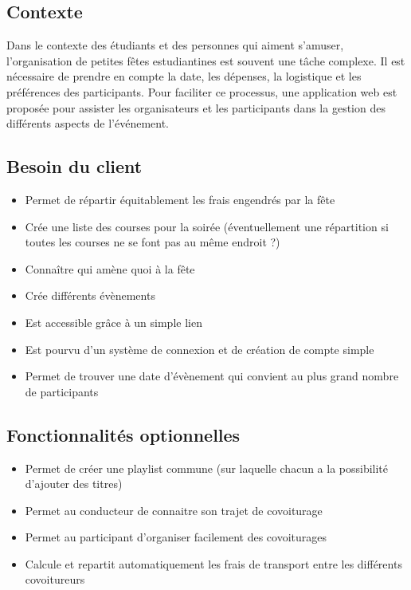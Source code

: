 \subsection{Contexte}\label{subsec:contexte}
Dans le contexte des étudiants et des personnes qui aiment s'amuser, l'organisation de petites fêtes estudiantines est souvent une tâche complexe.
Il est nécessaire de prendre en compte la date, les dépenses, la logistique et les préférences des participants.
Pour faciliter ce processus, une application web est proposée pour assister les organisateurs et les participants dans la gestion des différents aspects de l'événement.

\subsection{Besoin du client}\label{subsec:besoin-du-client}
\begin{itemize}
    \item Permet de répartir équitablement les frais engendrés par la fête
    \item Crée une liste des courses pour la soirée (éventuellement une répartition si toutes les courses ne se font pas au même endroit ?)
    \item Connaître qui amène quoi à la fête
    \item Crée différents évènements
    \item Est accessible grâce à un simple lien
    \item Est pourvu d'un système de connexion et de création de compte simple
    \item Permet de trouver une date d’évènement qui convient au plus grand nombre de participants
\end{itemize}

\subsection{Fonctionnalités optionnelles}\label{subsec:fonctionnalites-optionnelles}
\begin{itemize}
    \item Permet de créer une playlist commune (sur laquelle chacun a la possibilité d'ajouter des titres)
    \item Permet au conducteur de connaitre son trajet de covoiturage
    \item Permet au participant d'organiser facilement des covoiturages
    \item Calcule et repartit automatiquement les frais de transport entre les différents covoitureurs
\end{itemize}

